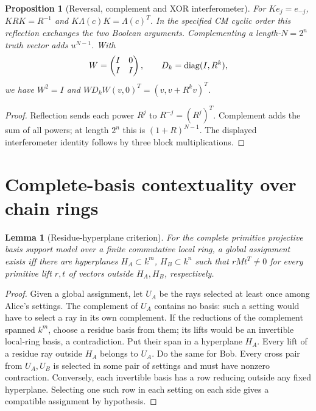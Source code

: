 \documentclass[11pt]{article}
\newtheorem{proposition}[theorem]{Proposition}
\newtheorem{lemma}[theorem]{Lemma}
\theoremstyle{remark}
\begin{document}
\begin{proposition}[Reversal, complement and XOR interferometer]
For $Ke_j=e_{-j}$, $KRK=R^{-1}$ and
$K\Lambda(c)K=\Lambda(c)^T$. In the specified CM cyclic order this reflection
exchanges the two Boolean arguments. Complementing a length-$N=2^n$ truth
vector adds $u^{N-1}$. With
\[
 W=\begin{pmatrix}I&0\\ I&I\end{pmatrix},\qquad
 D_k=\operatorname{diag}(I,R^k),
\]
we have $W^2=I$ and $WD_kW(v,0)^T=(v,v+R^kv)^T$.
\end{proposition}
\begin{proof}
Reflection sends each power $R^j$ to $R^{-j}= (R^j)^T$. Complement adds the
sum of all powers; at length $2^n$ this is $(1+R)^{N-1}$. The displayed
interferometer identity follows by three block multiplications.
\end{proof}

\section{Complete-basis contextuality over chain rings}
\label{sec:context}
\begin{lemma}[Residue-hyperplane criterion]
For the complete primitive projective basis support model over a finite
commutative local ring, a global assignment exists iff there are hyperplanes
$H_A\subset k^m$, $H_B\subset k^n$ such that $rMt^T\ne0$ for every primitive
lift $r,t$ of vectors outside $H_A,H_B$, respectively.
\end{lemma}
\begin{proof}
Given a global assignment, let $U_A$ be the rays selected at least once among
Alice's settings. The complement of $U_A$ contains no basis: such a setting
would have to select a ray in its own complement. If the reductions of the
complement spanned $k^m$, choose a residue basis from them; its lifts would be
an invertible local-ring basis, a contradiction. Put their span in a hyperplane
$H_A$. Every lift of a residue ray outside $H_A$ belongs to $U_A$.
Do the same for Bob. Every cross pair from $U_A,U_B$ is selected in some
pair of settings and must have nonzero contraction. Conversely, each invertible
basis has a row reducing outside any fixed hyperplane. Selecting one such row
in each setting on each side gives a compatible assignment by hypothesis.
\end{proof}
\end{document}
